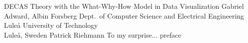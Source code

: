 \documentclass[12pt,a4paper,openright,final,twoside]{JU-template}
\begin{document}
\def\thesistitle{DECAS Theory with the What-Why-How Model in Data Visualization}
\def\theauthor{Gabriel Adward, Albin Forsberg}
\def\theaddress{Dept.\ of Computer Science and Electrical Engineering\\
Lule{\aa} University of Technology\\ Lule{\aa}, Sweden}

\def\supervisors{Patrick Riehmann}
\def\supervisorstring{Supervisor:} %
\def\dedication{To my surprise...}

\def\theabstract{}
\def\thepreface{preface}



\def\thelogo{} %


\startpreamble
  {\thesistitle}
  {\theauthor}
  {\theaddress}
  {\supervisors}
  {\dedication}
  {\theabstract}
  {\thepreface}
  {\thelogo}
\end{document}
